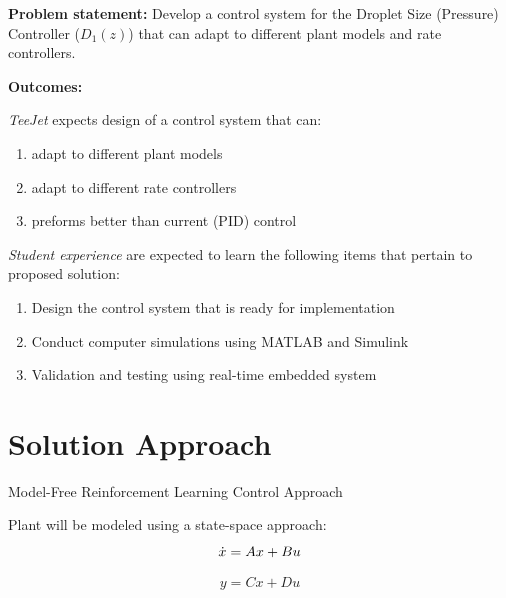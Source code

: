 %

{\bf Problem statement:} Develop a control system for the Droplet Size (Pressure) Controller ($D_1(z)$) that can adapt to different plant models and rate controllers.

{\bf Outcomes:}

\textit{TeeJet} expects design of a control system that can: %
\begin{enumerate}
\item adapt to different plant models
\item adapt to different rate controllers 
\item preforms better than current (PID) control
\end{enumerate}

\textit{Student experience} are expected to learn the following items that pertain to proposed solution:
\begin{enumerate}
\item Design the control system that is ready for implementation
  
\item Conduct computer simulations using MATLAB and Simulink
  
\item Validation and testing using real-time embedded system 
  

\end{enumerate}


\section{Solution Approach}
\label{sec:solutionApproach}

Model-Free Reinforcement Learning Control Approach

Plant will be modeled using a state-space approach:
\begin{equation}
    \dot{x} = Ax + Bu \\
\end{equation}

\begin{equation}
    y = Cx + Du
\end{equation}

